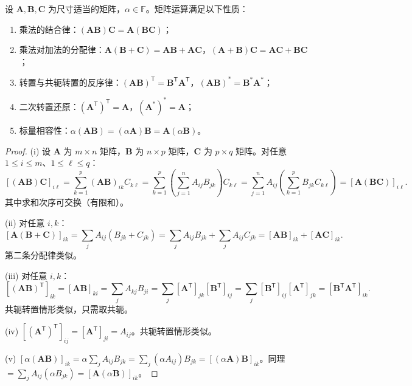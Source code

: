 \begin{property}[矩阵运算的代数性质]\label{ch5_matrix_operation_properties}
设 $\mathbf{A}, \mathbf{B}, \mathbf{C}$ 为尺寸适当的矩阵，$\alpha \in \mathbb{F}$。矩阵运算满足以下性质：
\begin{enumerate}[label=(\roman*)]
    \item 乘法的结合律：$(\mathbf{A}\mathbf{B})\mathbf{C} = \mathbf{A}(\mathbf{B}\mathbf{C})$；
    \item 乘法对加法的分配律：$\mathbf{A}(\mathbf{B}+\mathbf{C}) = \mathbf{A}\mathbf{B} + \mathbf{A}\mathbf{C}$，$(\mathbf{A}+\mathbf{B})\mathbf{C} = \mathbf{A}\mathbf{C} + \mathbf{B}\mathbf{C}$；
    \item 转置与共轭转置的反序律：$(\mathbf{A}\mathbf{B})^{\mathsf T} = \mathbf{B}^{\mathsf T}\mathbf{A}^{\mathsf T}$，$(\mathbf{A}\mathbf{B})^* = \mathbf{B}^*\mathbf{A}^*$；
    \item 二次转置还原：$(\mathbf{A}^{\mathsf T})^{\mathsf T} = \mathbf{A}$，$(\mathbf{A}^*)^* = \mathbf{A}$；
    \item 标量相容性：$\alpha(\mathbf{A}\mathbf{B}) = (\alpha\mathbf{A})\mathbf{B} = \mathbf{A}(\alpha\mathbf{B})$。
\end{enumerate}
\end{property}

\begin{proof}
(i) 设 $\mathbf{A}$ 为 $m \times n$ 矩阵，$\mathbf{B}$ 为 $n \times p$ 矩阵，$\mathbf{C}$ 为 $p \times q$ 矩阵。对任意 $1 \le i \le m$、$1 \le \ell \le q$：
\[
[(\mathbf{A}\mathbf{B})\mathbf{C}]_{i\ell} = \sum_{k=1}^p (\mathbf{A}\mathbf{B})_{ik} C_{k\ell} = \sum_{k=1}^p \left(\sum_{j=1}^n A_{ij}B_{jk}\right) C_{k\ell} = \sum_{j=1}^n A_{ij}\left(\sum_{k=1}^p B_{jk}C_{k\ell}\right) = [\mathbf{A}(\mathbf{B}\mathbf{C})]_{i\ell}.
\]
其中求和次序可交换（有限和）。

(ii) 对任意 $i,k$：
\[
[\mathbf{A}(\mathbf{B}+\mathbf{C})]_{ik} = \sum_j A_{ij}(B_{jk}+C_{jk}) = \sum_j A_{ij}B_{jk} + \sum_j A_{ij}C_{jk} = [\mathbf{A}\mathbf{B}]_{ik} + [\mathbf{A}\mathbf{C}]_{ik}.
\]
第二条分配律类似。

(iii) 对任意 $i,k$：
\[
[(\mathbf{A}\mathbf{B})^{\mathsf T}]_{ik} = [\mathbf{A}\mathbf{B}]_{ki} = \sum_j A_{kj}B_{ji} = \sum_j [\mathbf{A}^{\mathsf T}]_{jk}[\mathbf{B}^{\mathsf T}]_{ij} = \sum_j [\mathbf{B}^{\mathsf T}]_{ij}[\mathbf{A}^{\mathsf T}]_{jk} = [\mathbf{B}^{\mathsf T}\mathbf{A}^{\mathsf T}]_{ik}.
\]
共轭转置情形类似，只需取共轭。

(iv) $[(\mathbf{A}^{\mathsf T})^{\mathsf T}]_{ij} = [\mathbf{A}^{\mathsf T}]_{ji} = A_{ij}$。共轭转置情形类似。

(v) $[\alpha(\mathbf{A}\mathbf{B})]_{ik} = \alpha \sum_j A_{ij}B_{jk} = \sum_j (\alpha A_{ij})B_{jk} = [(\alpha\mathbf{A})\mathbf{B}]_{ik}$。同理 $= \sum_j A_{ij}(\alpha B_{jk}) = [\mathbf{A}(\alpha\mathbf{B})]_{ik}$。
\end{proof}

